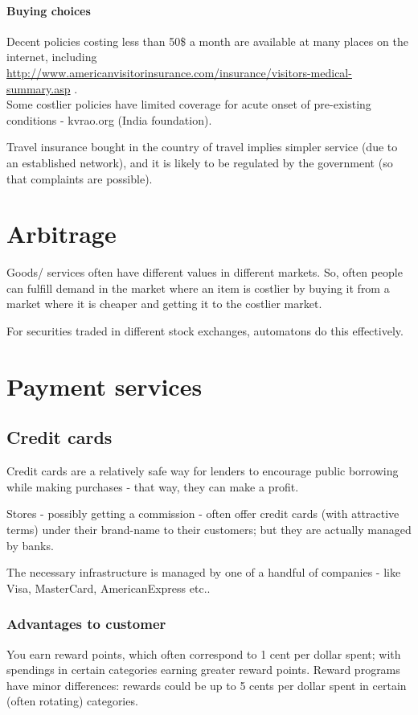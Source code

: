 \documentclass[oneside, article]{memoir}
\begin{document}
\subsubsection{Buying choices}
Decent policies costing less than 50\$ a month are available at many places on the internet, including \\ \tiny{\url{http://www.americanvisitorinsurance.com/insurance/visitors-medical-summary.asp}} . \\Some costlier policies have limited coverage for acute onset of pre-existing conditions - kvrao.org (India foundation).

Travel insurance bought in the country of travel implies simpler service (due to an established network), and it is likely to be regulated by the government (so that complaints are possible).

\chapter{Arbitrage}
Goods/ services often have different values in different markets. So, often people can fulfill demand in the market where an item is costlier by buying it from a market where it is cheaper and getting it to the costlier market.

For securities traded in different stock exchanges, automatons do this effectively.

\chapter{Payment services}
\section{Credit cards}
Credit cards are a relatively safe way for lenders to encourage public borrowing while making purchases - that way, they can make a profit.

Stores - possibly getting a commission - often offer credit cards (with attractive terms) under their brand-name to their customers; but they are actually managed by banks.

The necessary infrastructure is managed by one of a handful of companies - like Visa, MasterCard, AmericanExpress etc..

\subsection{Advantages to customer}
You earn reward points, which often correspond to 1 cent per dollar spent; with spendings in certain categories earning greater reward points. Reward programs have minor differences: rewards could be up to 5 cents per dollar spent in certain (often rotating) categories.
\end{document}
